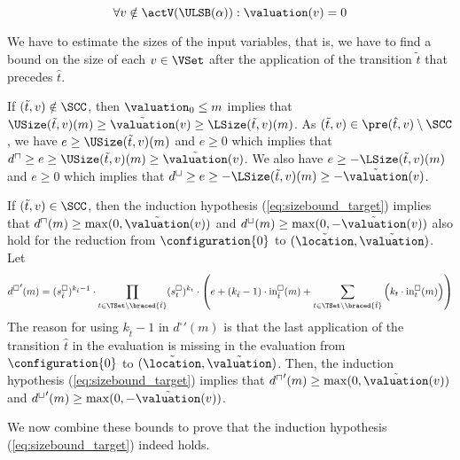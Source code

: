 \begin{equation} \label{eq:nonactiveequalzero}
  \forall v \notin \actV(\ULSB(\alpha)): \valuation(v) = 0
\end{equation}

We have to estimate the sizes of the input variables,
that is, we have to find a bound on the size of each $v \in \VSet$ after the application of the transition $\tilde{t}$ that precedes $\hat{t}$.

If $(\tilde{t}, v) \notin \SCC$, then $\valuation_0 \leq m$ implies that $\USize(\tilde{t}, v)(m) \geq \tilde{\valuation}(v) \geq \LSize(\tilde{t}, v)(m)$.
As $(\tilde{t}, v) \in \pre(\hat{t}, v) \setminus \SCC$, we have $e \geq \USize(\tilde{t}, v)(m)$ and $e \geq 0$ which implies that $d^\sqcap \geq e \geq \USize(\tilde{t}, v)(m) \geq \tilde{\valuation}(v)$.
We also have $e \geq -\LSize(\tilde{t}, v)(m)$ and $e \geq 0$ which implies that $d^\sqcup \geq e \geq -\LSize(\tilde{t}, v)(m) \geq -\tilde{\valuation}(v)$.

If $(\tilde{t}, v) \in \SCC$, then the induction hypothesis (\ref{eq:sizebound_target}) implies that $d^\sqcap(m) \geq \max(0, \tilde{\valuation}(v))$ and $d^\sqcup(m) \geq \max(0, -\tilde{\valuation}(v))$ also hold for the reduction from $\configuration{0}$ to $(\tilde{\location}, \tilde{\valuation})$.
Let
\begin{equation} \label{eq:induction_consequence}
  {d^\square}'(m) = (s^\square_{\hat{t}})^{k_{\hat{t}} - 1} \cdot \prod_{t \in \TSet \setminus \braced{\hat{t}}} (s^\square_t)^{k_t} \cdot \left( e + \left( k_{\hat{t}} - 1 \right) \cdot \text{in}^\square_{\hat{t}}(m) + \sum_{t \in \TSet \setminus \braced{\hat{t}}} \left( k_t \cdot \text{in}^\square_t(m) \right) \right)
\end{equation}
The reason for using $k_{\hat{t}} - 1$ in ${d^\square}'(m)$ is that the last application of the transition $\hat{t}$ in the evaluation is missing in the evaluation from $\configuration{0}$ to $(\tilde{\location}, \tilde{\valuation})$.
Then, the induction hypothesis (\ref{eq:sizebound_target}) implies that ${d^\sqcap}'(m) \geq \max(0, \tilde{\valuation}(v))$ and ${d^\sqcup}'(m) \geq \max(0, -\tilde{\valuation}(v))$.

We now combine these bounds to prove that the induction hypothesis (\ref{eq:sizebound_target}) indeed holds.

